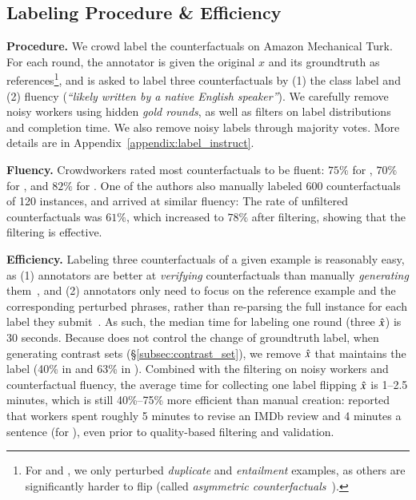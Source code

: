 


\subsection{Labeling Procedure \& Efficiency}
\label{subsec:label_efficiency}

\textbf{Procedure.}
We crowd label the counterfactuals on Amazon Mechanical Turk. 
For each round, the annotator is given the original $x$ and its groundtruth as references\footnote{For \qqp and \nli, we only perturbed \emph{duplicate} and \emph{entailment} examples, as others are significantly harder to flip (called \emph{asymmetric counterfactuals}~\cite{garg2019counterfactual}).}, and is asked to label three counterfactuals by (1) the class label and (2) fluency (\emph{``likely written by a native English speaker''}). 
We carefully remove noisy workers using hidden \emph{gold rounds}, as well as filters on label distributions and completion time.
We also remove noisy labels through majority votes.
More details are in Appendix~\ref{appendix:label_instruct}. 

\textbf{Fluency.}
Crowdworkers rated most counterfactuals to be fluent: $75\%$ for \dsst, $70\%$ for \dqqp, and $82\%$ for \dnli.
One of the authors also manually labeled 600 counterfactuals of 120 instances, and arrived at similar fluency:
The rate of unfiltered counterfactuals was $61\%$, which increased to $78\%$ after filtering, showing that the filtering is effective.

\textbf{Efficiency.}
Labeling three counterfactuals of a given example is reasonably easy, as (1) annotators are better at \emph{verifying} counterfactuals than manually \emph{generating} them~\cite{ribeiro2018sear}, and (2) annotators only need to focus on the reference example and the corresponding perturbed phrases, rather than re-parsing the full instance for each label they submit~\cite{Khashabi2020MoreBF}.
As such, the median time for labeling one round (three $\hat{x}$) is 30 seconds.
Because \sysname does not control the change of groundtruth label, when generating contrast sets (\S\ref{subsec:contrast_set}), we remove $\hat{x}$ that maintains the label (40\% in \nli and 63\% in \sst).
Combined with the filtering on noisy workers and counterfactual fluency, the average time for collecting one label flipping $\hat{x}$ is 1--2.5 minutes, which is still 40\%--75\% more efficient than manual creation:
\citet{kaushik2019learning} reported that workers spent roughly 5 minutes to revise an IMDb review and 4 minutes a sentence (for \nli), even prior to quality-based filtering and validation.


